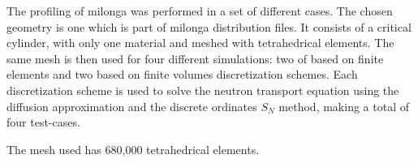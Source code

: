\documentclass[review]{elsarticle}
\begin{document}
The profiling of milonga was performed in a set of different cases. The chosen geometry is one which is part of
milonga distribution files. It consists of a critical cylinder, with only one material and meshed with
tetrahedrical elements. The same mesh is then used for four different simulations: two of based on
finite elements and two based on finite volumes discretization schemes. Each discretization scheme is used
to solve the neutron transport equation using the diffusion approximation and the discrete ordinates $S_N$ method,
making a total of four test-cases.

The mesh used has 680,000 tetrahedrical elements.





%
\end{document}
